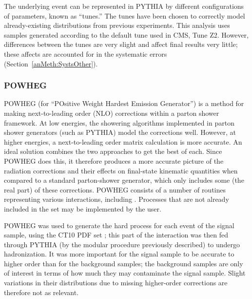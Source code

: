 
The underlying event 
can be represented in PYTHIA 
by different configurations of parameters, 
known as ``tunes.''  
The tunes have been chosen to correctly model 
already-existing distributions from previous 
experiments.  
This analysis uses samples generated 
according to the default tune used in CMS, 
Tune Z2.  
However, differences between the tunes 
are very slight and affect 
final results very little; 
these affects are accounted for 
in the systematic errors 
(Section~\ref{anMeth:SystsOther}).  

\subsubsection{POWHEG}
\label{sim:MCGensPowheg}



POWHEG (for ``POsitive Weight Hardest Emission Generator'') 
\cite{powheg} 
is a method for making next-to-leading order (NLO) 
corrections within a parton shower framework.  
At low energies, the showering algorithms implemented 
in parton shower generators (such as PYTHIA) 
model the corrections well.  
However, at higher energies, a next-to-leading order 
matrix calculation is more accurate.  
An ideal solution combines the two approaches 
to get the best of each.  
Since POWHEG does this, 
it therefore produces a more accurate picture 
of the radiation corrections and their effects 
on final-state kinematic quantities 
when compared to a standard parton-shower 
generator, %
which only includes some (the real part) 
of these corrections.  
POWHEG consists of a number of routines representing 
various %
interactions, 
including \Zee.  
Processes that are not already included 
in the set may be implemented by the user.  

POWHEG was used to generate the 
hard process for each event 
of the \Zee signal sample, 
using the CT10 PDF set \cite{CT10}; 
this part of the interaction was then 
fed through PYTHIA 
(by the modular procedure previously described) 
to undergo hadronization.  
It was more important for the signal 
sample to be accurate to higher order 
than for the background samples; 
the background samples are only of interest 
in terms of how much they may contaminate 
the signal sample.  
Slight variations in their distributions 
due to missing higher-order corrections are 
therefore not as relevant.  

